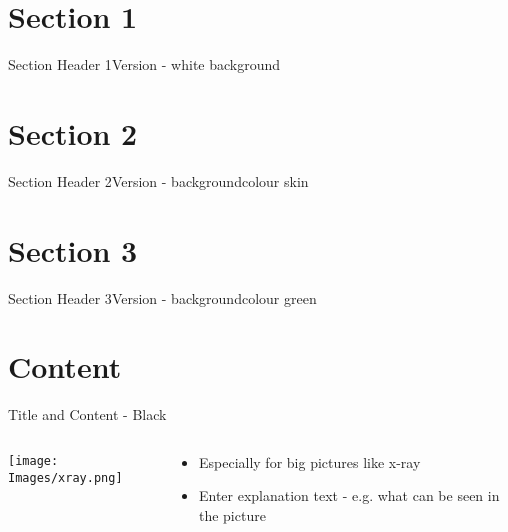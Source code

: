 \documentclass[10pt]{beamer} %
\begin{document}
\section{Section 1}
{\sectionheaderWhite %
\begin{frame}{Section Header 1}{Version - white background}
\end{frame}
}

\section{Section 2}
{\sectionheaderSkin %
\begin{frame}{Section Header 2}{Version - backgroundcolour skin}
\end{frame}
}

\section{Section 3}
{\sectionheaderGreen %
\begin{frame}{Section Header 3}{Version - backgroundcolour green}
\end{frame}
}

\section{Content}
{\blackSlide %
\begin{frame}{Title and Content - Black}
\begin{columns}
  \begin{column}{0.3\textwidth}
    \begin{center}
     \texttt{[image: Images/xray.png]}
     \end{center}
  \end{column}
  \begin{column}{0.7\textwidth}  %
    \begin{itemize}
	  \item Especially for big pictures like x-ray
	  \item Enter explanation text - e.g. what can be seen in the picture
	\end{itemize}
  \end{column}
\end{columns}

\end{frame}
}
\end{document}
